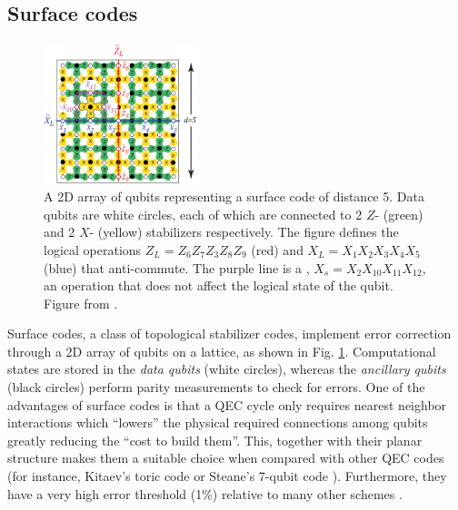 \subsection{Surface codes}
\begin{figure}
  \centering
  \includegraphics[width=0.4\textwidth]{images/surface_code.png}
  \caption{A 2D array of qubits representing a surface code of distance 5. Data
    qubits are white circles, each of which are connected to 2 $Z$- (green)
    and 2 $X$- (yellow) stabilizers respectively. The figure defines the logical
    operations $Z_L = Z_6Z_7Z_3Z_8Z_9$ (red) and $X_L = X_1X_2X_3X_4X_5$ (blue)
    that anti-commute. The purple line is a ,
    $X_s = X_2 X_{10}X_{11} X_{12} $, an operation that does not affect the
    logical state of the qubit. Figure from \cite{fowler12_surfac_codes}.}
  \label{fig:surface_code}
\end{figure}

Surface codes, a class of topological stabilizer codes, implement error
correction through a 2D array of qubits on a lattice, as shown in Fig.
\ref{fig:surface_code}. Computational states are stored in the \textit{data
  qubits} (white circles), whereas the \textit{ancillary qubits} (black circles)
perform parity measurements to check for errors. One of the advantages of
surface codes is that a QEC cycle only requires nearest neighbor interactions
which ``lowers'' the physical required connections among qubits greatly
reducing the ``cost to build them''. This, together with their planar
structure makes them a suitable choice when compared with other QEC codes (for
instance, Kitaev's toric code \cite{Kitaev_2003} or Steane's 7-qubit code
\cite{Steane_1996_QEC}). Furthermore, they have a very high error threshold
(1\%) relative to many other schemes \cite{terhal15}.

